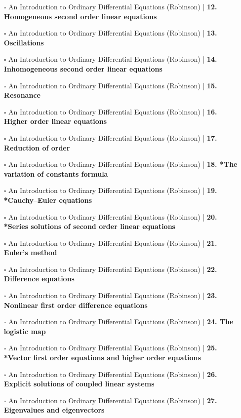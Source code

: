 \documentclass[a4, landscape, 12pt]{article}
\newcommand{\checkbox}{$\square$}%
\begin{document}
\begin{itemize}
{}
\item [\checkbox] An Introduction to Ordinary Differential Equations (Robinson)  | \textbf{12. Homogeneous second order linear equations
}
\item [\checkbox] An Introduction to Ordinary Differential Equations (Robinson)  | \textbf{13. Oscillations
}
\item [\checkbox] An Introduction to Ordinary Differential Equations (Robinson)  | \textbf{14. Inhomogeneous second order linear equations
}
\item [\checkbox] An Introduction to Ordinary Differential Equations (Robinson)  | \textbf{15. Resonance
}
\item [\checkbox] An Introduction to Ordinary Differential Equations (Robinson)  | \textbf{16. Higher order linear equations
}
\item [\checkbox] An Introduction to Ordinary Differential Equations (Robinson)  | \textbf{17. Reduction of order
}
\item [\checkbox] An Introduction to Ordinary Differential Equations (Robinson)  | \textbf{18. *The variation of constants formula
}
\item [\checkbox] An Introduction to Ordinary Differential Equations (Robinson)  | \textbf{19. *Cauchy–Euler equations
}
\item [\checkbox] An Introduction to Ordinary Differential Equations (Robinson)  | \textbf{20. *Series solutions of second order linear equations
}
\item [\checkbox] An Introduction to Ordinary Differential Equations (Robinson)  | \textbf{21. Euler's method
}
\item [\checkbox] An Introduction to Ordinary Differential Equations (Robinson)  | \textbf{22. Difference equations
}
\item [\checkbox] An Introduction to Ordinary Differential Equations (Robinson)  | \textbf{23. Nonlinear first order difference equations
}
\item [\checkbox] An Introduction to Ordinary Differential Equations (Robinson)  | \textbf{24. The logistic map
}
\item [\checkbox] An Introduction to Ordinary Differential Equations (Robinson)  | \textbf{25. *Vector first order equations and higher order equations
}
\item [\checkbox] An Introduction to Ordinary Differential Equations (Robinson)  | \textbf{26. Explicit solutions of coupled linear systems
}
\item [\checkbox] An Introduction to Ordinary Differential Equations (Robinson)  | \textbf{27. Eigenvalues and eigenvectors
}
\end{itemize}
\end{document}
